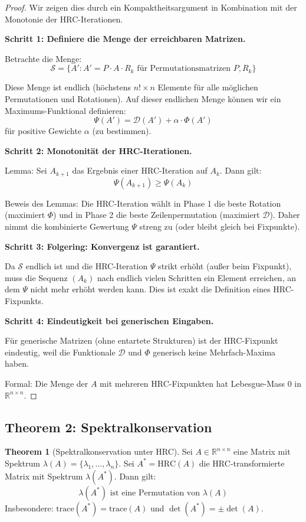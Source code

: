 \documentclass[a4paper,12pt]{article}
\theoremstyle{definition}
\newtheorem{theorem}{Theorem}
\begin{document}
\begin{proof}
Wir zeigen dies durch ein Kompaktheitsargument in Kombination mit der Monotonie der HRC-Iterationen.

\textbf{Schritt 1: Definiere die Menge der erreichbaren Matrizen.}

Betrachte die Menge:
\[
\mathcal{S} = \{ A' : A' = P \cdot A \cdot R_k \text{ für Permutationsmatrizen } P, R_k \}
\]

Diese Menge ist endlich (höchstens $n! \times n$ Elemente für alle möglichen Permutationen und Rotationen). Auf dieser endlichen Menge können wir ein Maximums-Funktional definieren:
\[
\Psi(A') = \mathcal{D}(A') + \alpha \cdot \Phi(A')
\]
für positive Gewichte $\alpha$ (zu bestimmen).

\textbf{Schritt 2: Monotonität der HRC-Iterationen.}

Lemma: Sei $A_{k+1}$ das Ergebnis einer HRC-Iteration auf $A_k$. Dann gilt:
\[
\Psi(A_{k+1}) \geq \Psi(A_k)
\]

Beweis des Lemmas: Die HRC-Iteration wählt in Phase 1 die beste Rotation (maximiert $\Phi$) und in Phase 2 die beste Zeilenpermutation (maximiert $\mathcal{D}$). Daher nimmt die kombinierte Gewertung $\Psi$ streng zu (oder bleibt gleich bei Fixpunkte).

\textbf{Schritt 3: Folgering: Konvergenz ist garantiert.}

Da $\mathcal{S}$ endlich ist und die HRC-Iteration $\Psi$ strikt erhöht (außer beim Fixpunkt), muss die Sequenz $(A_k)$ nach endlich vielen Schritten ein Element erreichen, an dem $\Psi$ nicht mehr erhöht werden kann. Dies ist exakt die Definition eines HRC-Fixpunkts.

\textbf{Schritt 4: Eindeutigkeit bei generischen Eingaben.}

Für generische Matrizen (ohne entartete Strukturen) ist der HRC-Fixpunkt eindeutig, weil die Funktionale $\mathcal{D}$ und $\Phi$ generisch keine Mehrfach-Maxima haben.

Formal: Die Menge der $A$ mit mehreren HRC-Fixpunkten hat Lebesgue-Mass 0 in $\mathbb{R}^{n \times n}$.
\end{proof}

\subsection{Theorem 2: Spektralkonservation}

\begin{theorem}[Spektralkonservation unter HRC]
\label{thm:spectral_conservation}
Sei $A \in \mathbb{R}^{n \times n}$ eine Matrix mit Spektrum $\lambda(A) = \{\lambda_1, \ldots, \lambda_n\}$. Sei $A^* = \text{HRC}(A)$ die HRC-transformierte Matrix mit Spektrum $\lambda(A^*)$. Dann gilt:
\[
\lambda(A^*) \text{ ist eine Permutation von } \lambda(A)
\]
Insbesondere: $\text{trace}(A^*) = \text{trace}(A)$ und $\det(A^*) = \pm \det(A)$.
\end{theorem}
\end{document}
